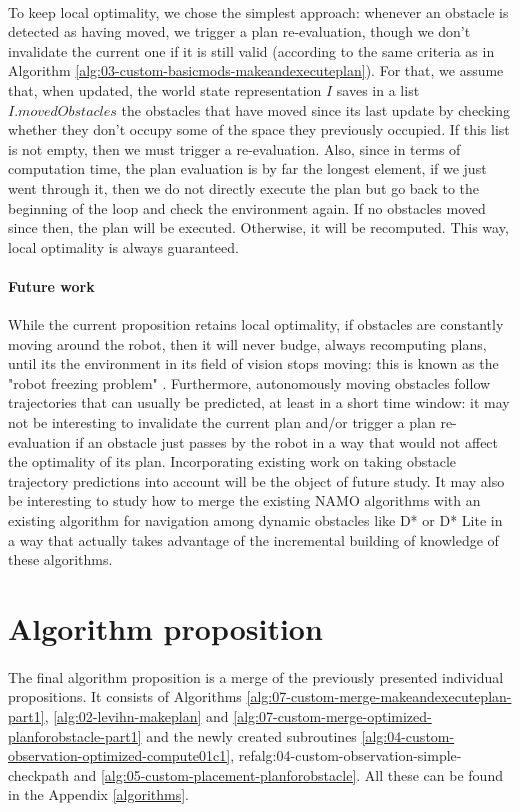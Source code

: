 \paragraph{} To keep local optimality, we chose the simplest approach: whenever an obstacle is detected as having moved, we trigger a plan re-evaluation, though we don't invalidate the current one if it is still valid (according to the same criteria as in Algorithm  \ref{alg:03-custom-basicmods-makeandexecuteplan}). For that, we assume that, when updated, the world state representation $I$ saves in a list $I.movedObstacles$ the obstacles that have moved since its last update by checking whether they don't occupy some of the space they previously occupied. If this list is not empty, then we must trigger a re-evaluation. Also, since in terms of computation time, the plan evaluation is by far the longest element, if we just went through it, then we do not directly execute the plan but go back to the beginning of the loop and check the environment again. If no obstacles moved since then, the plan will be executed. Otherwise, it will be recomputed. This way, local optimality is always guaranteed.

\paragraph{Future work} While the current proposition retains local optimality, if obstacles are constantly moving around the robot, then it will never budge, always recomputing plans, until its the environment in its field of vision stops moving: this is known as the "robot freezing problem" \parencite{trautman_unfreezing_2010}. Furthermore, autonomously moving obstacles follow trajectories that can usually be predicted, at least in a short time window: it may not be interesting to invalidate the current plan and/or trigger a plan re-evaluation if an obstacle just passes by the robot in a way that would not affect the optimality of its plan. Incorporating existing work on taking obstacle trajectory predictions into account will be the object of future study. It may also be interesting to study how to merge the existing NAMO algorithms with an existing algorithm for navigation among dynamic obstacles like D* or D* Lite in a way that actually takes advantage of the incremental building of knowledge of these algorithms.

\section{Algorithm proposition}\label{merged_proposition_section}

\paragraph{} The final algorithm proposition is a merge of the previously presented individual propositions. It consists of Algorithms \ref{alg:07-custom-merge-makeandexecuteplan-part1}, \ref{alg:02-levihn-makeplan} and \ref{alg:07-custom-merge-optimized-planforobstacle-part1} and the newly created subroutines \ref{alg:04-custom-observation-optimized-compute01c1}, ref{alg:04-custom-observation-simple-checkpath} and \ref{alg:05-custom-placement-planforobstacle}. All these can be found in the Appendix \ref{algorithms}.
